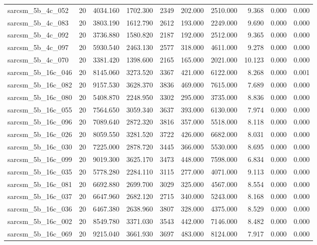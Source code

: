 \begin{tabular}{lrrrrrrrrr}
sarcsm\_5b\_4c\_052 & 20 & 4034.160 & 1702.300 & 2349 & 202.000 & 2510.000 & 9.368 & 0.000 & 0.000 \\
sarcsm\_5b\_4c\_083 & 20 & 3803.190 & 1612.790 & 2612 & 193.000 & 2249.000 & 9.690 & 0.000 & 0.000 \\
sarcsm\_5b\_4c\_092 & 20 & 3736.880 & 1580.820 & 2187 & 192.000 & 2512.000 & 9.365 & 0.000 & 0.000 \\
sarcsm\_5b\_4c\_097 & 20 & 5930.540 & 2463.130 & 2577 & 318.000 & 4611.000 & 9.278 & 0.000 & 0.000 \\
sarcsm\_5b\_4c\_070 & 20 & 3381.420 & 1398.600 & 2165 & 165.000 & 2021.000 & 10.123 & 0.000 & 0.000 \\
sarcsm\_5b\_16c\_046 & 20 & 8145.060 & 3273.520 & 3367 & 421.000 & 6122.000 & 8.268 & 0.000 & 0.001 \\
sarcsm\_5b\_16c\_082 & 20 & 9157.530 & 3628.370 & 3836 & 469.000 & 7615.000 & 7.689 & 0.000 & 0.000 \\
sarcsm\_5b\_16c\_080 & 20 & 5408.870 & 2248.950 & 3302 & 295.000 & 3735.000 & 8.836 & 0.000 & 0.000 \\
sarcsm\_5b\_16c\_055 & 20 & 7564.650 & 3059.340 & 3637 & 393.000 & 6130.000 & 7.974 & 0.000 & 0.000 \\
sarcsm\_5b\_16c\_096 & 20 & 7089.640 & 2872.320 & 3816 & 357.000 & 5518.000 & 8.118 & 0.000 & 0.000 \\
sarcsm\_5b\_16c\_026 & 20 & 8059.550 & 3281.520 & 3722 & 426.000 & 6682.000 & 8.031 & 0.000 & 0.000 \\
sarcsm\_5b\_16c\_030 & 20 & 7225.000 & 2878.720 & 3445 & 366.000 & 5530.000 & 8.695 & 0.000 & 0.000 \\
sarcsm\_5b\_16c\_099 & 20 & 9019.300 & 3625.170 & 3473 & 448.000 & 7598.000 & 6.834 & 0.000 & 0.000 \\
sarcsm\_5b\_16c\_035 & 20 & 5778.280 & 2284.110 & 3115 & 277.000 & 4071.000 & 9.113 & 0.000 & 0.000 \\
sarcsm\_5b\_16c\_081 & 20 & 6692.880 & 2699.700 & 3029 & 325.000 & 4567.000 & 8.554 & 0.000 & 0.000 \\
sarcsm\_5b\_16c\_037 & 20 & 6647.960 & 2682.120 & 2715 & 340.000 & 5243.000 & 8.168 & 0.000 & 0.000 \\
sarcsm\_5b\_16c\_036 & 20 & 6467.380 & 2638.960 & 3807 & 328.000 & 4375.000 & 8.529 & 0.000 & 0.000 \\
sarcsm\_5b\_16c\_002 & 20 & 8549.780 & 3371.030 & 3543 & 442.000 & 7146.000 & 8.482 & 0.000 & 0.000 \\
sarcsm\_5b\_16c\_069 & 20 & 9215.040 & 3661.930 & 3697 & 483.000 & 8124.000 & 7.917 & 0.000 & 0.000 \\

\end{tabular}
